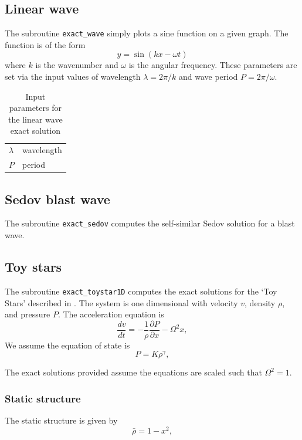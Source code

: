\documentclass[a4paper,11pt]{article}
\begin{document}
\subsection{Linear wave}
 The subroutine \verb+exact_wave+ simply plots a sine function on a given graph.
 The function is of the form
\begin{equation}
y = \sin{(k x - \omega t)}
\end{equation}
where $k$ is the wavenumber and $\omega$ is the angular frequency. These
parameters are set via the input values of wavelength $\lambda = 2\pi/k$ and
wave period $P = 2\pi/\omega$.

\begin{table}
\centering
\begin{tabular}{|l|l|}
\hline
$\lambda$ & wavelength \\
$P$ & period \\
\hline
\end{tabular}
\caption{Input parameters for the linear wave exact solution}
\end{table}

\subsection{Sedov blast wave}
 The subroutine \verb+exact_sedov+ computes the self-similar Sedov solution for a blast wave.

\subsection{Toy stars}
 The subroutine \verb+exact_toystar1D+ computes the exact solutions for the `Toy
Stars' described in \citet{mp04}. The system is one dimensional with velocity $v$, density $\rho$, and pressure
$P$. The acceleration equation is 
\begin{equation}
\frac{dv}{dt} = - \frac{1}{\rho} \frac{\partial P}{\partial x}  - \Omega^2 x,
\end{equation}
 We assume the equation of state is 
\begin{equation}
P = K \rho^\gamma,
\end{equation} 

 The exact solutions provided assume the equations are scaled such that
$\Omega^2 = 1$.
 
\subsubsection{ Static structure}
The static structure is given by
\begin{equation}
\bar \rho = 1- x^2,
\end{equation}
\end{document}
